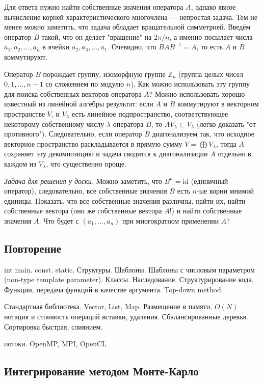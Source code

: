 \documentclass{book}
\begin{document}
Для ответа нужно найти собственные значения оператора $A$, однако явное вычисление корней
характеристического многочлена --- непростая задача. Тем не менее можно заметить, что задача
обладает вращательной симметрией. Введём оператор $B$ такой, что он делает "вращение" на $2 \pi
/ n$, а именно посылает числа $a_1, a_2, ..., a_n$ в ячейки $a_2, a_3, ..., a_1$. Очевидно, что
$B A B^{-1} = A$, то есть $A$ и $B$ коммутируют.

Оператор $B$ порождает группу, изоморфную группе $\mathbb Z_n$ (группа целых чисел ${0, 1, ..., n -
1}$ со сложением по модулю $n$). Как можно использовать эту группу для поиска собственных
векторов оператора $A$? Можно использовать хорошо известный из линейной алгебры результат: если
$A$ и $B$ коммутируют в векторном пространстве $V$, и $V_\lambda$ есть линейное
подпространство, соответствующее некоторому собственному числу $\lambda$ оператора $B$, то $A
V_\lambda \subset V_\lambda$ (легко доказать "от противного"). Следовательно, если оператор $B$
диагонализуем так, что исходное векторное пространство раскладывается в прямую сумму $V =
\bigoplus V_\lambda$, тогда $A$ сохраняет эту декомпозицию и задача сводится к диагонализации
$A$ отдельно в каждом из $V_\lambda$, что существенно проще.

\textit{Задача для решения у доски.} Можно заметить, что $B^n = \mathrm{id}$ (единичный оператор), следовательно, все
собственные значения $B$ есть $n$-ые корни мнимой единицы. Показать, что все собственные значения
различны, найти их, найти собственные вектора (они же собственные вектора $A$!) и найти собственные
значения $A$. Что будет с $(a_1, ..., a_n)$ при многократном применении $A$?

\subsection{Повторение}

int main. const. static. Структуры. Шаблоны. Шаблоны с числовым параметром (non-type template parameter). Классы.
Наследование. 
Структурирование кода. Функции, передача функций в качестве аргумента. Top-down method. 

Стандартная библиотека. Vector, List, Map. Размещение в памяти. $O(N)$ нотация и стоимость операций
вставки, удаления. Сбалансированные деревья. Сортировка быстрая, слиянием.

потоки. OpenMP, MPI, OpenCL

\subsection{Интегрирование методом Монте-Карло}
\end{document}
